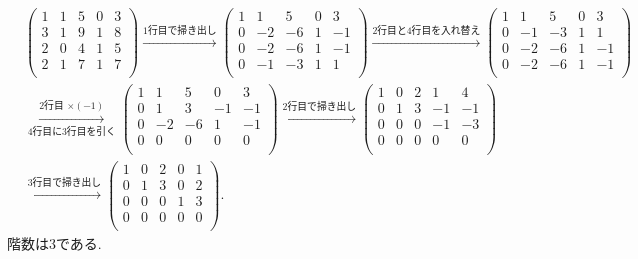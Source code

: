 \documentclass[dvipdfmx,a4paper,11pt]{article}
\theoremstyle{definition}
\begin{document}
\begin{align*}
 &\begin{pmatrix}
 1& 1& 5  & 0&3\\
 3& 1& 9  & 1&8\\
 2& 0& 4 & 1&5\\
 2& 1& 7 & 1&7\\
 \end{pmatrix}
 \overset{\text{1行目で掃き出し}}{\longrightarrow} 
 \begin{pmatrix}
 1& 1& 5  & 0&3\\
 0& -2& -6 & 1&-1\\
 0& -2& -6 & 1&-1\\
 0& -1& -3 & 1&1\\
 \end{pmatrix}
 \overset{\text{2行目と4行目を入れ替え}}{\longrightarrow} 
 \begin{pmatrix}
 1& 1& 5  & 0&3\\
  0& -1& -3 & 1&1\\
 0& -2& -6 & 1&-1\\
 0& -2& -6 & 1&-1\\
 \end{pmatrix} \\
& \overset{ \text{2行目 $\times (-1)$}}{\underset{\text{4行目に3行目を引く} }{\longrightarrow}}
 \begin{pmatrix}
 1& 1& 5  & 0&3\\
  0& 1& 3 & -1&-1\\
 0& -2& -6 & 1&-1\\
  0&0&0&0& 0\\
 \end{pmatrix}
 \overset{\text{2行目で掃き出し}}{\longrightarrow} 
 \begin{pmatrix}
 1& 0& 2  & 1&4\\
  0& 1& 3 & -1&-1\\
 0& 0& 0 & -1&-3\\
  0&0&0&0& 0\\
 \end{pmatrix} \\
& \overset{\text{3行目で掃き出し}}{\longrightarrow} 
 \begin{pmatrix}
 1& 0& 2 & 0&1\\
  0& 1& 3 & 0&2\\
 0& 0& 0 & 1&3\\
  0&0&0&0& 0\\
 \end{pmatrix}.
 \end{align*}
階数は3である.
\end{document}
